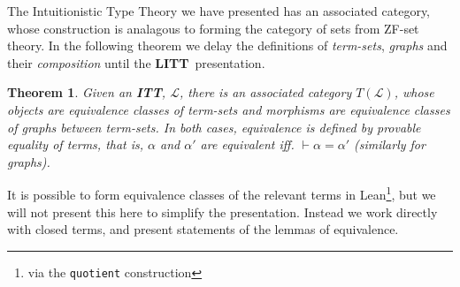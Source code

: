 \documentclass[12pt,leqno]{article}
\def\lc{\lstinline}
\newcommand{\ITT}{\textbf{ITT}}
\newcommand{\LITT}{\textbf{LITT}}
\newtheorem{thm}[theorem]{Theorem}
\theoremstyle{example}
\numberwithin{equation}{section}
\begin{document}
The Intuitionistic Type Theory we have presented has an associated category, whose construction is analagous to forming the category of sets from ZF-set theory. In the following theorem we delay the definitions of \emph{term-sets}, \emph{graphs} and their \emph{composition} until the \LITT~presentation. 

\begin{thm}
  Given an \ITT,  $\mathcal{L}$, there is an associated category $T(\mathcal{L})$, whose objects are equivalence classes of term-sets and morphisms are equivalence classes of graphs between term-sets. In both cases, equivalence is defined by provable equality of terms, that is, $\alpha$ and $\alpha'$ are equivalent iff. $\vdash \alpha = \alpha'$ (similarly for graphs). 
\end{thm}

It is possible to form equivalence classes of the relevant terms in Lean\footnote{via the \lc{quotient} construction}, but we will not present this here to simplify the presentation. Instead we work directly with closed terms, and present statements of the lemmas of equivalence.
\end{document}

